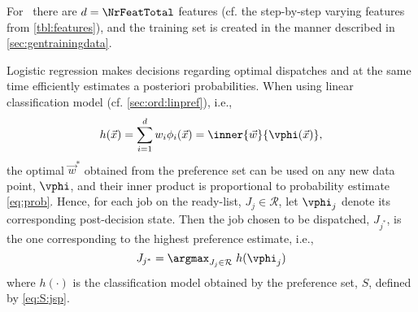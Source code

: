 For \JSP\ there are $d=\NrFeatTotal$ features (cf. the step-by-step varying features from \cref{tbl:features}), and the training set is created in the manner described in \cref{sec:gentrainingdata}.

Logistic regression makes decisions regarding optimal dispatches and at the same time efficiently estimates a posteriori probabilities. When using linear classification model (cf. \cref{sec:ord:linpref}), i.e., 
\begin{equation}\label{eq:jssp:linweights}
h(\vec{x})=\sum_{i=1}^d w_i\phi_i(\vec{x})=\inner{\vec{w}}{\vphi(\vec{x})},
\end{equation}
the optimal $\vec{w}^*$ obtained from the preference set can be used on any new data point, $\vphi$, and their inner product is proportional to probability estimate \cref{eq:prob}. 
Hence, for each job on the ready-list, $J_j\in\mathcal{R}$, let $\vphi_j$ denote its corresponding  post-decision state. Then the job chosen to be dispatched, $J_{j^*}$, is the one corresponding to the highest preference estimate, i.e.,
\begin{equation}\label{eq:lin}
J_{j^*}=\argmax_{J_j\in \mathcal{R}}\; h(\vphi_j)
\end{equation}
where $h(\cdot)$ is the classification model obtained by the preference set, $S$, defined by \cref{eq:S:jsp}. 

